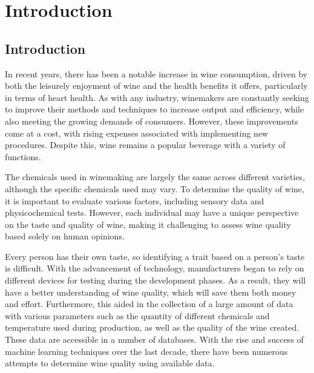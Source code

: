 \documentclass[a4paper, 12pt]{report}
\begin{document}
\newpage
\tableofcontents
\listoffigures
\listoftables
\lfoot{}


\newpage
{}
\chapter{Introduction}

\section{Introduction }
\par In recent years, there has been a notable increase in wine consumption, driven by both the leisurely enjoyment of wine and the health benefits it offers, particularly in terms of heart health. As with any industry, winemakers are constantly seeking to improve their methods and techniques to increase output and efficiency, while also meeting the growing demands of consumers. However, these improvements come at a cost, with rising expenses associated with implementing new procedures. Despite this, wine remains a popular beverage with a variety of functions.
\par The chemicals used in winemaking are largely the same across different varieties, although the specific chemicals used may vary. To determine the quality of wine, it is important to evaluate various factors, including sensory data and physicochemical tests. However, each individual may have a unique perspective on the taste and quality of wine, making it challenging to assess wine quality based solely on human opinions. \par Every person has their own taste, so identifying a trait based on a person's taste is difficult. With the advancement of technology, manufacturers began to rely on different devices for testing during the development phases. As a result, they will have a better understanding of wine quality, which will save them both money and effort. Furthermore, this aided in the collection of a large amount of data with various parameters such as the quantity of different chemicals and temperature used during production, as well as the quality of the wine created. These data are accessible in a number of databases. With the rise and success of machine learning techniques over the last decade, there have been numerous attempts to determine wine quality using available data.
\end{document}
